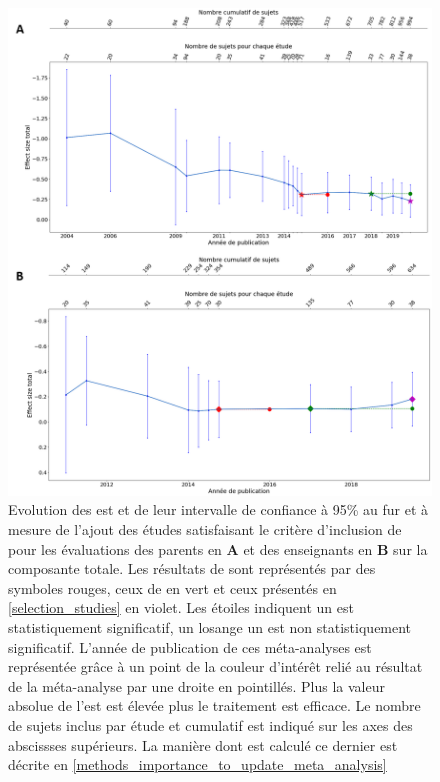 \begin{figure}[h!]
  \centering
	\includegraphics[width=1\linewidth]{figures/chapter-2/meta-analysis-evolution-summary-effect-total} 
  \caption[Evolution des  au fur et à mesure de l'ajout de nouvelles études.]{Evolution des \gls{est} et de leur intervalle de confiance à 95\% au fur et à mesure de l'ajout des études satisfaisant le critère d'inclusion de \citet{Cortese2016} pour les évaluations des 
	parents en \textbf{A} et des enseignants en \textbf{B} sur la composante totale.
  Les résultats de \citep{Cortese2016} sont représentés par des symboles rouges, ceux de \citet{Bussalb2016clinical} en vert et ceux présentés en \ref{selection_studies} en violet. Les étoiles 
	indiquent un \gls{est} statistiquement significatif, un losange un \gls{est} non statistiquement significatif. L'année de publication de ces méta-analyses est représentée grâce à un point de la couleur 
	d'intérêt relié au résultat de la méta-analyse par une droite en pointillés.
	Plus la valeur absolue de l'\gls{est} est élevée plus le traitement est efficace.
	Le nombre de sujets inclus par étude et cumulatif est indiqué sur les axes des abscissses supérieurs. La manière dont est calculé ce dernier est 
	décrite en \ref{methods_importance_to_update_meta_analysis}}
  \label{Figure:meta_analysis_evolution_est_total}
\end{figure}

